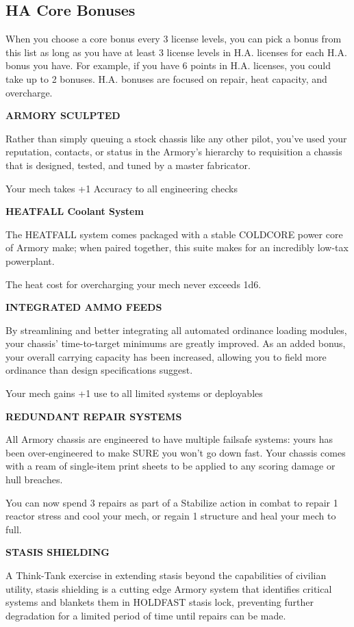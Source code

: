 \subsection{HA Core Bonuses}

When you choose a core bonus every 3 license levels, you can pick a bonus from this list as long as you have at least 3 license levels in H.A. licenses for each H.A. bonus you have. For example, if you have 6 points in H.A. licenses, you could take up to 2 bonuses. H.A. bonuses are focused on repair, heat capacity, and overcharge.


\textbf{ARMORY SCULPTED}

Rather than simply queuing a stock chassis like any other pilot, you've used your reputation, contacts, or status in the Armory's hierarchy to requisition a chassis that is designed, tested, and tuned by a master fabricator.

Your mech takes +1 Accuracy to all engineering checks

\textbf{HEATFALL Coolant System}

The HEATFALL system comes packaged with a stable COLDCORE power core of Armory make; when paired together, this suite makes for an incredibly low-tax powerplant.

The heat cost for overcharging your mech never exceeds 1d6.


\textbf{INTEGRATED AMMO FEEDS}

By streamlining and better integrating all automated ordinance loading modules, your chassis' time-to-target minimums are greatly improved. As an added bonus, your overall carrying capacity has been increased, allowing you to field more ordinance than design specifications suggest.

Your mech gains +1 use to all limited systems or deployables


\textbf{REDUNDANT REPAIR SYSTEMS}

All Armory chassis are engineered to have multiple failsafe systems: yours has been over-engineered to make SURE you won't go down fast. Your chassis comes with a ream of single-item print sheets to be applied to any scoring damage or hull breaches.

You can now spend 3 repairs as part of a Stabilize action in combat to repair 1 reactor stress and cool your mech, or regain 1 structure and heal your mech to full.


\textbf{STASIS SHIELDING}

A Think-Tank exercise in extending stasis beyond the capabilities of civilian utility, stasis shielding is a cutting edge Armory system that identifies critical systems and blankets them in HOLDFAST stasis lock, preventing further degradation for a limited period of time until repairs can be made.


